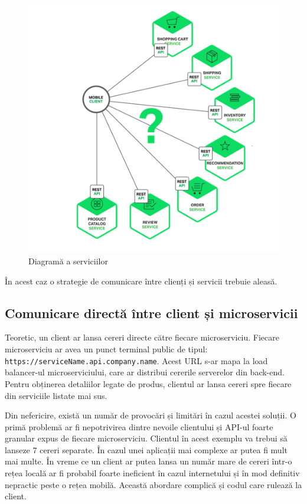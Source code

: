 \documentclass[12pt, a4paper, oneside, romanian]{teza-upb}
\begin{document}
\begin{figure}[ht]
\centering
\includegraphics[scale=0.4]{img/Richardson-microservices-part2-2_microservices-client.png}
\caption{Diagramă a serviciilor}
\label{fig:arhi_componente}
\end{figure}

În acest caz o strategie de comunicare între clienți și servicii trebuie aleasă. 


\newpage
\subsection{Comunicare directă între client și microservicii}

Teoretic, un client ar lansa cereri directe către fiecare microserviciu. Fiecare microserviciu ar avea un punct terminal public de tipul: \texttt{https://serviceName.api.company.name}. Acest URL s-ar mapa la load balancer-ul microserviciului, care ar distribui cererile serverelor din back-end. Pentru obținerea detaliilor legate de produs, clientul ar lansa cereri spre fiecare din serviciile listate mai sus. 

Din nefericire, există un număr de provocări și limitări în cazul acestei soluții. O primă problemă ar fi nepotrivirea dintre nevoile clientului și API-ul foarte granular expus de fiecare microserviciu. Clientul în acest exemplu va trebui să lanseze 7 cereri separate. În cazul unei aplicații mai complexe ar putea fi mult mai multe. În vreme ce un client ar putea lansa un număr mare de cereri într-o rețea locală ar fi probabil foarte ineficient în cazul internetului și în mod definitiv nepractic peste o rețea mobilă. Această abordare complică și codul care rulează la client. 
\end{document}
